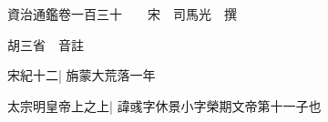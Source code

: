 






























































資治通鑑卷一百三十　　宋　司馬光　撰

胡三省　音註

宋紀十二|{
	旃蒙大荒落一年}


太宗明皇帝上之上|{
	諱彧字休景小字榮期文帝第十一子也}


